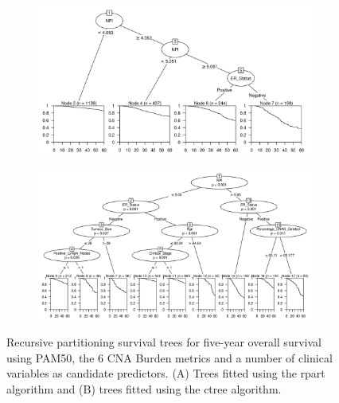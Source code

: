 \begin{figure}[!htb]
\centering

\vspace{1cm}

\begin{subfigure}{\textwidth}
\subcaption{}
\includegraphics[width=1\textwidth]{../figures/Appendices/Appendix_B/Clin_PartyKit_Survival_Burden_FiveYearOS_PAM50.png}
\end{subfigure}

\vspace{2cm}

\begin{subfigure}{\textwidth}
\subcaption{}
\includegraphics[width=1\textwidth]{../figures/Appendices/Appendix_B/Clin_Ctree_Survival_Burden_FiveYearOS_PAM50.png}
\end{subfigure}

\vspace{1cm}

\caption[Recursive partitioning survival trees for five-year overall survival using PAM50, the 6 CNA Burden metrics and a number of clinical variables as candidate predictors.]{Recursive partitioning survival trees for five-year overall survival using PAM50, the 6 CNA Burden metrics and a number of clinical variables as candidate predictors. (A) Trees fitted using the rpart algorithm and (B) trees fitted using the ctree algorithm.}
\end{figure}

